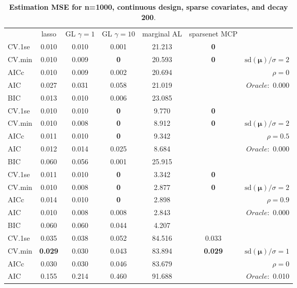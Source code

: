 \clearpage
\begin{table}\vspace{-.5cm}
\caption[l]{ { \bf Estimation MSE for n=1000, continuous design, 
sparse covariates, and  decay  200}.}
\vspace{-.5cm}
\footnotesize{}
\begin{center}
\begin{tabular}{l*{5}{c}|r}
& lasso & GL $\gamma=1$ & GL $\gamma=10$ & marginal AL & sparsenet MCP  & \\
 \cline{1-7}
CV.1se & 0.010 & 0.010 & 0.001 & 21.213 & {\bf 0} & \\
CV.min & 0.010 & 0.009 & {\bf 0} & 20.593 & {\bf 0} &  $\mathrm{sd}(\mathbf{\mu})/\sigma=2$ \\
AICc & 0.010 & 0.009 & 0.002 & 20.694 & & $\rho=0$ \\
AIC & 0.027 & 0.031 & 0.058 & 21.019 & &  \multirow{2}{*}{$Oracle: $ 0.000} \\
BIC & 0.013 & 0.010 & 0.006 & 23.085 & &  \\
 \hline 
CV.1se & 0.010 & 0.010 & {\bf 0} & 9.770 & {\bf 0} & \\
CV.min & 0.010 & 0.008 & {\bf 0} & 8.912 & {\bf 0} &  $\mathrm{sd}(\mathbf{\mu})/\sigma=2$ \\
AICc & 0.011 & 0.010 & {\bf 0} & 9.342 & & $\rho=0.5$ \\
AIC & 0.012 & 0.014 & 0.025 & 8.684 & &  \multirow{2}{*}{$Oracle: $ 0.000} \\
BIC & 0.060 & 0.056 & 0.001 & 25.915 & &  \\
 \hline 
CV.1se & 0.011 & 0.010 & {\bf 0} & 3.342 & {\bf 0} & \\
CV.min & 0.010 & 0.008 & {\bf 0} & 2.877 & {\bf 0} &  $\mathrm{sd}(\mathbf{\mu})/\sigma=2$ \\
AICc & 0.014 & 0.010 & {\bf 0} & 2.898 & & $\rho=0.9$ \\
AIC & 0.010 & 0.008 & 0.008 & 2.843 & &  \multirow{2}{*}{$Oracle: $ 0.000} \\
BIC & 0.060 & 0.060 & 0.044 & 4.207 & &  \\
 \hline 
CV.1se & 0.035 & 0.038 & 0.052 & 84.516 & 0.033 & \\
CV.min & {\bf 0.029} & 0.030 & 0.043 & 83.894 & {\bf 0.029} &  $\mathrm{sd}(\mathbf{\mu})/\sigma=1$ \\
AICc & 0.030 & 0.030 & 0.046 & 83.679 & & $\rho=0$ \\
AIC & 0.155 & 0.214 & 0.460 & 91.688 & &  \multirow{2}{*}{$Oracle: $ 0.010} \\

\end{tabular}
\end{center}
\end{table}

